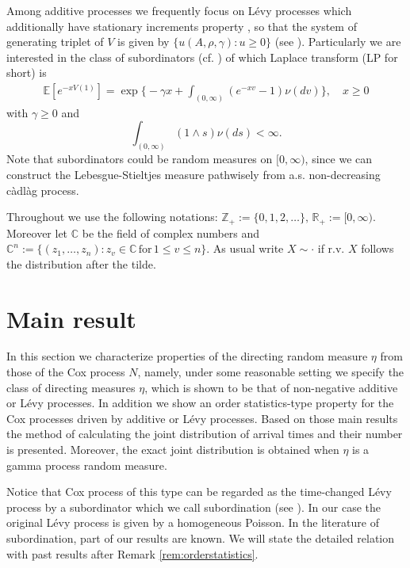 \documentclass[11pt,leqno%
]{amsart}
\newcommand{\R}{\mathbb{R}}
\newcommand{\E }{{\mathbb E}}
\newcommand{\Z }{{\mathbb Z}}
\newcommand{\1}{{\mathbf 1}}
\begin{document}
 Among additive processes we frequently focus on 
 L\'evy processes %
 which additionally have stationary increments property%
 , so that the
 system of generating triplet of $V$ is given by $\{u (A,\rho,\gamma):u\ge
 0\}$ (see \cite[Corollary 8.3]{sato:1999}). Particularly we are interested
 in the class of subordinators (cf. \cite[Theorem 30.1]{sato:1999}) of
 which Laplace transform (LP for short) is 
 \begin{align}
 \label{lh:represent}
  \E[e^{-xV(1)}] = \exp \big\{
 -\gamma x + \int_{(0,\infty)}(e^{-xv}-1)\nu(dv)\big\},\quad %
 x\ge 0
 \end{align} with $\gamma\ge 0$ and 
 \[
  \int_{(0,\infty)} (1\wedge s)\nu(ds) <\infty. 
 \]
 Note that subordinators could be random measures on $[0,\infty)$, since 
 we can construct the Lebesgue-Stieltjes measure pathwisely from 
 a.s. non-decreasing c\`adl\`ag process. 

 Throughout we use the following notations:
 $\Z_+:=\{0,1,2,\ldots\},\,\R_+:=[0,\infty)$. Moreover let  
 $\mathbb{C}$ be the field of complex numbers and 
 $\mathbb{C}^n:=\{(z_1,\ldots,z_n):z_v \in \mathbb{C}\, \mathrm{for}\, 1\le
 v\le n\}$. 
 As usual write $X\sim\cdot $ if r.v. $X$
follows the distribution after the tilde.

\section{Main result}

In this section we characterize properties of the directing random measure
$\eta$ from those of the Cox process $N$, namely, under some reasonable setting
we specify the class of directing 
measures $\eta$, which is shown to be that of non-negative additive or L\'evy
processes. In addition we show an order statistics-type property for the Cox
processes driven by additive or L\'evy
processes. Based on those main results the method of calculating the joint distribution of arrival
times and their number is presented. Moreover, 
the exact joint distribution is obtained when $\eta$ is a gamma process
 random measure.

Notice that Cox process of this type can be regarded as the time-changed
L\'evy process by a subordinator which we call subordination
(see \cite[Definition 30.2]{sato:1999}). In our case
the original L\'evy process is given by a homogeneous Poisson.
In the literature of subordination, part of our results are known. We
will state the detailed relation with past results after
Remark \ref{rem:orderstatistics}. 
\end{document}
